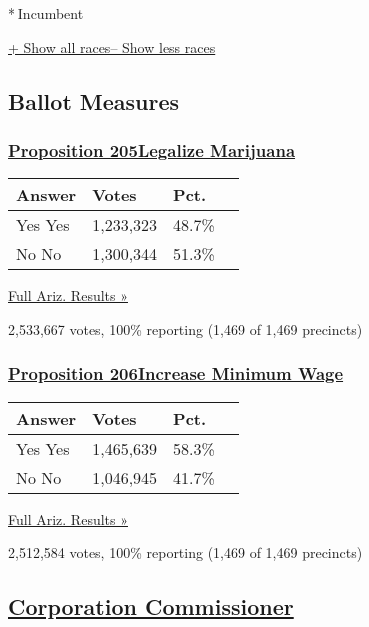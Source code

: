 * Incumbent~

\protect\hyperlink{}{+ Show all races-- Show less races}

\hypertarget{ballot-measures}{%
\subsection{Ballot Measures}\label{ballot-measures}}

\hypertarget{proposition-205legalize-marijuana}{%
\subsubsection{\texorpdfstring{\href{//www.nytimes.com/elections/2016/results/arizona-ballot-measure-205-legalize-marijuana}{Proposition
205Legalize
Marijuana}}{Proposition 205Legalize Marijuana}}\label{proposition-205legalize-marijuana}}

\begin{longtable}[]{@{}llll@{}}
\toprule
Answer & Votes & Pct. &\tabularnewline
\midrule
\endhead
 Yes Yes & 1,233,323 & 48.7\% &\tabularnewline
 No No & 1,300,344 & 51.3\% &\tabularnewline
\bottomrule
\end{longtable}

\href{https://www.nytimes.com/elections/2016/results/arizona}{Full Ariz.
Results »}

2,533,667 votes, 100\% reporting (1,469 of 1,469 precincts)

\hypertarget{proposition-206increase-minimum-wage}{%
\subsubsection{\texorpdfstring{\href{//www.nytimes.com/elections/2016/results/arizona-ballot-measure-206-increase-minimum-wage}{Proposition
206Increase Minimum
Wage}}{Proposition 206Increase Minimum Wage}}\label{proposition-206increase-minimum-wage}}

\begin{longtable}[]{@{}llll@{}}
\toprule
Answer & Votes & Pct. &\tabularnewline
\midrule
\endhead
 Yes Yes & 1,465,639 & 58.3\% &\tabularnewline
 No No & 1,046,945 & 41.7\% &\tabularnewline
\bottomrule
\end{longtable}

\href{https://www.nytimes.com/elections/2016/results/arizona}{Full Ariz.
Results »}

2,512,584 votes, 100\% reporting (1,469 of 1,469 precincts)

\hypertarget{corporation-commissioner}{%
\subsection{\texorpdfstring{\href{https://www.nytimes.com/elections/2016/results/arizona-corporation-commissioner-4-year-term}{Corporation
Commissioner}}{Corporation Commissioner}}\label{corporation-commissioner}}

